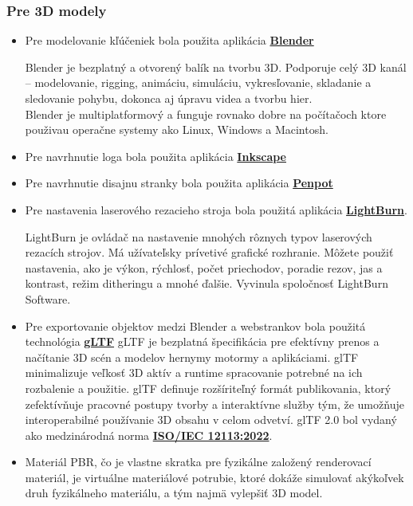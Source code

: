       \subsubsection{Pre 3D modely}
        \begin{itemize}
          \item{
            Pre modelovanie kľúčeniek bola použita aplikácia \textbf{\href{https://www.blender.org/}{Blender}} 
            
            Blender je bezplatný a otvorený balík na tvorbu 3D. Podporuje celý 3D kanál – modelovanie, rigging, animáciu, simuláciu, vykresľovanie, skladanie a sledovanie pohybu, dokonca aj úpravu videa a tvorbu hier. \\
            Blender je multiplatformový a funguje rovnako dobre na počítačoch ktore použivau operačne systemy ako Linux, Windows a Macintosh.
          }
          \item{
              Pre navrhnutie loga bola použita aplikácia \textbf{\href{https://inkscape.org/}{Inkscape}}
          }
          \item{
              Pre navrhnutie disajnu stranky bola použita aplikácia \textbf{\href{https://penpot.app/}{Penpot}}
          }
          \item{
            Pre nastavenia laserového rezacieho stroja bola použitá aplikácia \textbf{\href{https://lightburnsoftware.com/}{LightBurn}}.

            LightBurn je ovládač na nastavenie mnohých rôznych typov laserových rezacích strojov. Má užívateľsky prívetivé grafické rozhranie. Môžete použiť nastavenia, ako je výkon, rýchlosť, počet priechodov, poradie rezov, jas a kontrast, režim ditheringu a mnohé ďalšie. Vyvinula spoločnosť LightBurn Software.
          }
          \item{
            Pre exportovanie objektov medzi Blender a webstrankov bola použitá technológia \textbf{\href{https://www.khronos.org/gltf/}{gLTF}}
            gLTF je bezplatná špecifikácia pre efektívny prenos a načítanie 3D scén a modelov hernymy motormy a aplikáciami. glTF minimalizuje veľkosť 3D aktív a runtime spracovanie potrebné na ich rozbalenie a použitie. glTF definuje rozšíriteľný formát publikovania, ktorý zefektívňuje pracovné postupy tvorby a interaktívne služby tým, že umožňuje interoperabilné používanie 3D obsahu v celom odvetví. glTF 2.0 bol vydaný ako medzinárodná norma \textbf{\href{https://www.iso.org/standard/83990.html}{ISO/IEC 12113:2022}}.
          }
          \item{
            Materiál PBR, čo je vlastne skratka pre fyzikálne založený renderovací materiál, je virtuálne materiálové potrubie, ktoré dokáže simulovať akýkoľvek druh fyzikálneho materiálu, a tým najmä vylepšiť 3D model.
          }
        \end{itemize}

